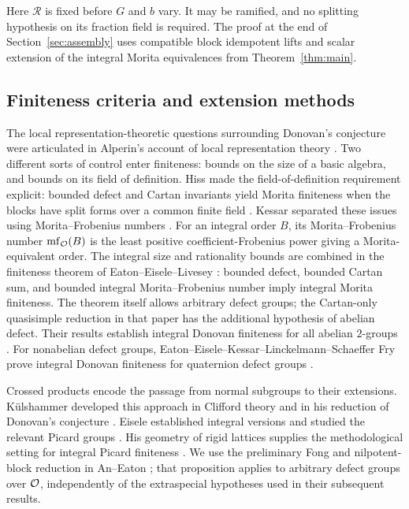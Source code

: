 Here $\mathcal R$ is fixed before $G$ and $b$ vary.  It may be ramified,
and no splitting hypothesis on its fraction field is required.  The
proof at the end of Section~\ref{sec:assembly} uses compatible block
idempotent lifts and scalar extension of the integral Morita
equivalences from Theorem~\ref{thm:main}.

\subsection{Finiteness criteria and extension methods}

The local representation-theoretic questions surrounding Donovan's
conjecture were articulated in Alperin's account of local
representation theory \cite{Alperin1980}.  Two different sorts of
control enter finiteness: bounds on the size of a basic algebra, and
bounds on its field of definition.  Hiss made the field-of-definition
requirement explicit: bounded defect and Cartan invariants yield Morita
finiteness when the blocks have split forms over a common finite field
\cite[Proposition~5.1]{HissBrauer2000}.  Kessar separated these issues
using Morita--Frobenius numbers \cite{KessarRemark2004}.
For an integral order $B$, its Morita--Frobenius number
$\operatorname{mf}_{\mathcal O}(B)$ is the least positive coefficient-Frobenius power
giving a Morita-equivalent order.  The integral size and rationality
bounds are combined in the finiteness theorem of
Eaton--Eisele--Livesey \cite[Theorem~3.10]{EEL2020}: bounded defect,
bounded Cartan sum, and bounded integral Morita--Frobenius number imply
integral Morita finiteness.  The theorem itself allows arbitrary defect
groups; the Cartan-only quasisimple reduction in that paper has the
additional hypothesis of abelian defect.
Their results establish integral Donovan finiteness for all abelian
$2$-groups \cite[Corollary~4.6]{EEL2020}.  For nonabelian defect
groups, Eaton--Eisele--Kessar--Linckelmann--Schaeffer Fry prove
integral Donovan finiteness for quaternion defect groups
\cite[Theorem~1.1]{EEKLS2026}.

Crossed products encode the passage from normal subgroups to their
extensions.  K\"ulshammer developed this approach in Clifford theory
and in his reduction of Donovan's conjecture
\cite{KulshammerClifford1990,Kulshammer1995}.  Eisele established integral
versions and studied the relevant Picard groups
\cite{EiseleReduction2021,EiseleGeometry2022}.  His geometry of
rigid lattices supplies the methodological setting for integral
Picard finiteness \cite[Theorems~A and~B]{EiseleGeometry2022}.  We use the preliminary
Fong and nilpotent-block reduction in An--Eaton
\cite[Proposition~6.1]{AnEaton2025}; that proposition applies to
arbitrary defect groups over $\mathcal O$, independently of the extraspecial
hypotheses used in their subsequent results.

